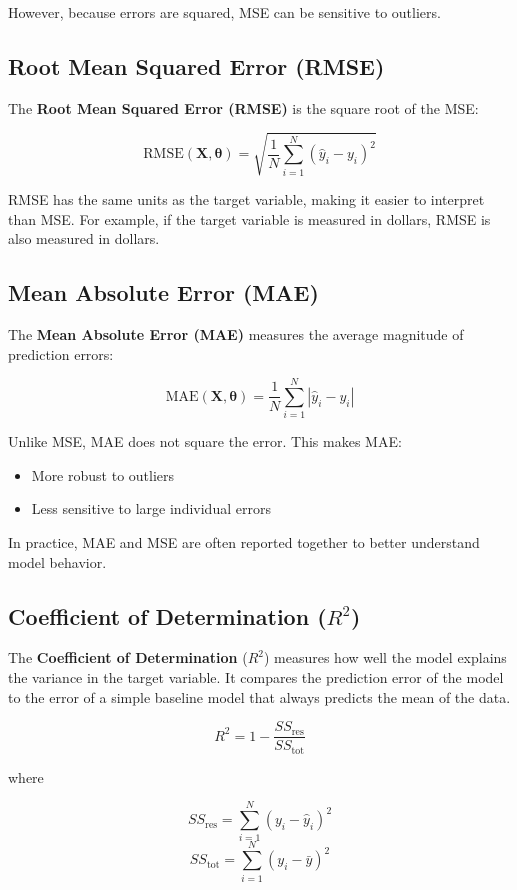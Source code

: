 \documentclass{article}
\newcommand{\vecb}[1]{\boldsymbol{#1}} %
\newcommand{\matb}[1]{\mathbf{#1}}     %
\begin{document}
However, because errors are squared, MSE can be sensitive to outliers.

\subsection{Root Mean Squared Error (RMSE)}

The \textbf{Root Mean Squared Error (RMSE)} is the square root of the MSE:

\[
\text{RMSE}(\matb{X},\vecb{\theta})=\sqrt{\frac{1}{N}\sum_{i=1}^{N}(\hat{y}_i-y_i)^2}
\]

RMSE has the same units as the target variable, making it easier to interpret than MSE.  
For example, if the target variable is measured in dollars, RMSE is also measured in dollars.

\subsection{Mean Absolute Error (MAE)}

The \textbf{Mean Absolute Error (MAE)} measures the average magnitude of prediction errors:

\[
\text{MAE}(\matb{X},\vecb{\theta})=\frac{1}{N}\sum_{i=1}^{N}|\hat{y}_i-y_i|
\]

Unlike MSE, MAE does not square the error. This makes MAE:

\begin{itemize}
\item More robust to outliers
\item Less sensitive to large individual errors
\end{itemize}

In practice, MAE and MSE are often reported together to better understand model behavior.

\subsection{Coefficient of Determination ($R^2$)}

The \textbf{Coefficient of Determination} ($R^2$) measures how well the model explains the variance in the target variable.  
It compares the prediction error of the model to the error of a simple baseline model that always predicts the mean of the data.

\[
R^2 = 1 - \frac{SS_{\text{res}}}{SS_{\text{tot}}}
\]

where

\[
SS_{\text{res}}=\sum_{i=1}^{N}(y_i-\hat{y}_i)^2
\]
\[
SS_{\text{tot}}=\sum_{i=1}^{N}(y_i-\bar{y})^2
\]
\end{document}
